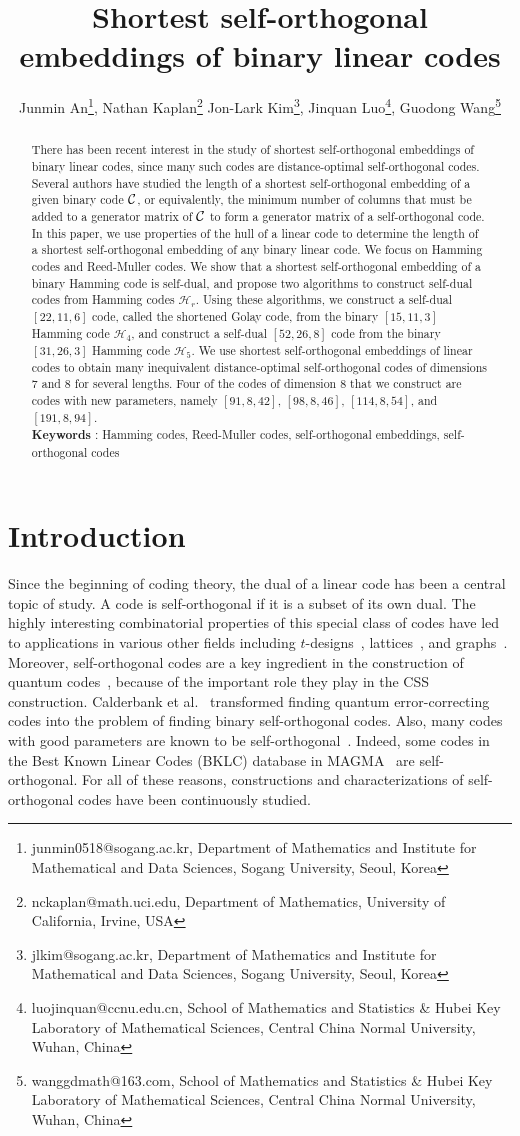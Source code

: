 \documentclass{article}
\title{Shortest self-orthogonal embeddings of binary linear codes}
\author{Junmin An\thanks{junmin0518@sogang.ac.kr, Department of Mathematics and Institute for Mathematical and Data Sciences, Sogang University, Seoul, Korea}, 
Nathan Kaplan\thanks{nckaplan@math.uci.edu, Department of Mathematics, University of California, Irvine, USA}
Jon-Lark Kim\thanks{jlkim@sogang.ac.kr, Department of Mathematics and Institute for Mathematical and Data Sciences, Sogang University, Seoul, Korea},
Jinquan Luo\thanks{luojinquan@ccnu.edu.cn, School of Mathematics and Statistics \& Hubei Key Laboratory of Mathematical Sciences, Central China Normal University, Wuhan, China},
Guodong Wang\thanks{wanggdmath@163.com, School of Mathematics and Statistics \& Hubei Key Laboratory of Mathematical Sciences, Central China Normal University, Wuhan, China}}
\date{}
\theoremstyle{definition}
\theoremstyle{remark}
\newcommand{\C}{\mbox{$\cal C$}}
\begin{document}
\maketitle

\begin{abstract}
There has been recent interest in the study of shortest self-orthogonal embeddings of binary linear codes, since many such codes are distance-optimal self-orthogonal codes.  Several authors have studied the length of a shortest self-orthogonal embedding of a given binary code $\C$, or equivalently, the minimum number of columns that must be added to a generator matrix of $\C$ to form a generator matrix of a self-orthogonal code.   In this paper, we use properties of the hull of a linear code to determine the length of a shortest self-orthogonal embedding of any binary linear code. We focus on Hamming codes and Reed-Muller codes.  We show that a shortest self-orthogonal embedding of a binary Hamming code is self-dual, and propose two algorithms to construct self-dual codes from Hamming codes $\mathcal H_r$. Using these algorithms, we construct a self-dual $[22, 11, 6]$ code, called the shortened Golay code, from the binary $[15, 11, 3]$ Hamming code $\mathcal H_4$, and construct a self-dual $[52, 26, 8]$ code from the binary $[31, 26, 3]$ Hamming code $\mathcal H_5$. We use shortest self-orthogonal embeddings of linear codes to obtain many inequivalent distance-optimal self-orthogonal codes of dimensions $7$ and $8$ for several lengths. Four of the codes of dimension $8$ that we construct are codes with new parameters, namely $[91, 8, 42],\, [98, 8, 46],\,[114, 8, 54]$, and $[191, 8, 94]$.\\

\textbf{Keywords} : Hamming codes, Reed-Muller codes, self-orthogonal embeddings, self-orthogonal codes
\end{abstract}


\section{Introduction}
Since the beginning of coding theory, the dual of a linear code has been a central topic of study. A code is self-orthogonal if it is a subset of its own dual.  The highly interesting combinatorial properties of this special class of codes have led to applications in various other fields including $t$-designs~\cite{Hadara2004, Bachoc2004}, lattices~\cite{Harada2009, Bouyuklieva2013}, and graphs~\cite{Fellah2024}. Moreover, self-orthogonal codes are a key ingredient in the construction of quantum codes~\cite{Galindo2019, Jin2010, Jin2012, Kim2002:2, Lisoneks2014}, because of the important role they play in the CSS construction. Calderbank et al.~\cite{Calderbank1998} transformed finding quantum error-correcting codes into the problem of finding binary self-orthogonal codes. Also, many codes with good parameters are known to be self-orthogonal~\cite{Zhang2025}. Indeed, some codes in the Best Known Linear Codes (BKLC) database in MAGMA~\cite{Magma1994} are self-orthogonal. For all of these reasons, constructions and characterizations of self-orthogonal codes have been continuously studied.
\end{document}
